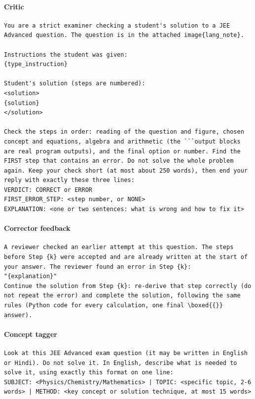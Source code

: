 \paragraph{Critic}
\begin{small}\begin{verbatim}
You are a strict examiner checking a student's solution to a JEE
Advanced question. The question is in the attached image{lang_note}.

Instructions the student was given:
{type_instruction}

Student's solution (steps are numbered):
<solution>
{solution}
</solution>

Check the steps in order: reading of the question and figure, chosen
concept and equations, algebra and arithmetic (the ```output blocks
are real program outputs), and the final option or number. Find the
FIRST step that contains an error. Do not solve the whole problem
again. Keep your check short (at most about 250 words), then end your
reply with exactly these three lines:
VERDICT: CORRECT or ERROR
FIRST_ERROR_STEP: <step number, or NONE>
EXPLANATION: <one or two sentences: what is wrong and how to fix it>
\end{verbatim}\end{small}

\paragraph{Corrector feedback}
\begin{small}\begin{verbatim}
A reviewer checked an earlier attempt at this question. The steps
before Step {k} were accepted and are already written at the start of
your answer. The reviewer found an error in Step {k}:
"{explanation}"
Continue the solution from Step {k}: re-derive that step correctly (do
not repeat the error) and complete the solution, following the same
rules (Python code for every calculation, one final \boxed{{}}
answer).
\end{verbatim}\end{small}

\paragraph{Concept tagger}
\begin{small}\begin{verbatim}
Look at this JEE Advanced exam question (it may be written in English
or Hindi). Do not solve it. In English, describe what is needed to
solve it, using exactly this format on one line:
SUBJECT: <Physics/Chemistry/Mathematics> | TOPIC: <specific topic, 2-6
words> | METHOD: <key concept or solution technique, at most 15 words>
\end{verbatim}\end{small}


